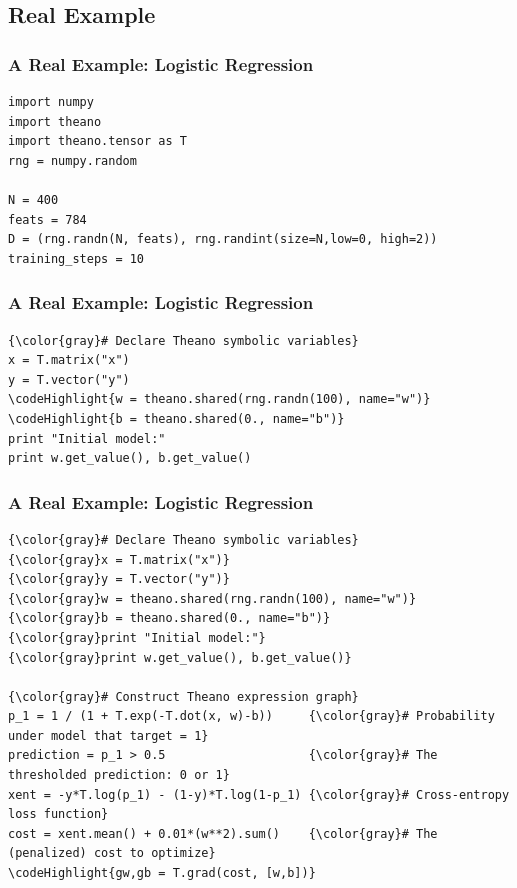 \documentclass[a4paper,9pt]{beamer}
\begin{document}
\subsection{Real Example}

\begin{frame}[fragile]
  \frametitle{A Real Example: Logistic Regression}
\begin{Verbatim}[commandchars=\\\{\}]
import numpy
import theano
import theano.tensor as T
rng = numpy.random

N = 400
feats = 784
D = (rng.randn(N, feats), rng.randint(size=N,low=0, high=2))
training_steps = 10
\end{Verbatim}
\end{frame}

\begin{frame}[fragile]
  \frametitle{A Real Example: Logistic Regression}
\begin{Verbatim}[commandchars=\\\{\}]
{\color{gray}# Declare Theano symbolic variables}
x = T.matrix("x")
y = T.vector("y")
\codeHighlight{w = theano.shared(rng.randn(100), name="w")}
\codeHighlight{b = theano.shared(0., name="b")}
print "Initial model:"
print w.get_value(), b.get_value()
\end{Verbatim}
\end{frame}

\begin{frame}[fragile]
  \frametitle{A Real Example: Logistic Regression}
\begin{Verbatim}[commandchars=\\\{\}]
{\color{gray}# Declare Theano symbolic variables}
{\color{gray}x = T.matrix("x")}
{\color{gray}y = T.vector("y")}
{\color{gray}w = theano.shared(rng.randn(100), name="w")}
{\color{gray}b = theano.shared(0., name="b")}
{\color{gray}print "Initial model:"}
{\color{gray}print w.get_value(), b.get_value()}

{\color{gray}# Construct Theano expression graph}
p_1 = 1 / (1 + T.exp(-T.dot(x, w)-b))     {\color{gray}# Probability under model that target = 1}
prediction = p_1 > 0.5                    {\color{gray}# The thresholded prediction: 0 or 1}
xent = -y*T.log(p_1) - (1-y)*T.log(1-p_1) {\color{gray}# Cross-entropy loss function}
cost = xent.mean() + 0.01*(w**2).sum()    {\color{gray}# The (penalized) cost to optimize}
\codeHighlight{gw,gb = T.grad(cost, [w,b])}
\end{Verbatim}
\end{frame}
\end{document}
